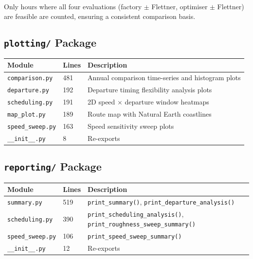 \documentclass[a4paper,11pt]{article}
\begin{document}
Only hours where all four evaluations (factory \(\pm\) Flettner, optimiser \(\pm\)
Flettner) are feasible are counted, ensuring a consistent comparison basis.

\subsection{\texttt{plotting/} Package}
\label{sec:orgaa65db5}

\begin{center}
\begin{tabular}{llp{8cm}}
\toprule
Module & Lines & Description\\[0pt]
\midrule
\texttt{comparison.py} & 481 & Annual comparison time-series and histogram plots\\[0pt]
\texttt{departure.py} & 192 & Departure timing flexibility analysis plots\\[0pt]
\texttt{scheduling.py} & 191 & 2D speed \(\times\) departure window heatmaps\\[0pt]
\texttt{map\_plot.py} & 189 & Route map with Natural Earth coastlines\\[0pt]
\texttt{speed\_sweep.py} & 163 & Speed sensitivity sweep plots\\[0pt]
\texttt{\_\_init\_\_.py} & 8 & Re-exports\\[0pt]
\bottomrule
\end{tabular}
\end{center}

\subsection{\texttt{reporting/} Package}
\label{sec:org5191b38}

\begin{center}
\begin{tabular}{llp{8cm}}
\toprule
Module & Lines & Description\\[0pt]
\midrule
\texttt{summary.py} & 519 & \texttt{print\_summary()}, \texttt{print\_departure\_analysis()}\\[0pt]
\texttt{scheduling.py} & 390 & \texttt{print\_scheduling\_analysis()}, \texttt{print\_roughness\_sweep\_summary()}\\[0pt]
\texttt{speed\_sweep.py} & 106 & \texttt{print\_speed\_sweep\_summary()}\\[0pt]
\texttt{\_\_init\_\_.py} & 12 & Re-exports\\[0pt]
\bottomrule
\end{tabular}
\end{center}
\end{document}
